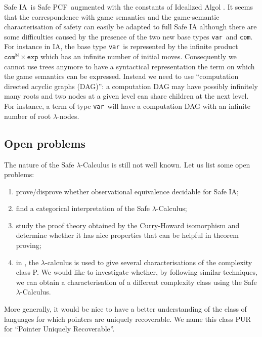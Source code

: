\documentclass{llncs}
\newcommand\nat{\mathbb{N}}
\newcommand\ialgol{\textsf{IA}}
\newcommand\iacom{\texttt{com}}
\newcommand\iaexp{\texttt{exp}}
\newcommand\iavar{\texttt{var}}
\newcommand\pcf{\textsf{PCF}}
\begin{document}
Safe \ialgol\ is Safe \pcf\ augmented with the constants of Idealized Algol
\cite{Reynolds81}. It seems that the correspondence with game semantics and the game-semantic characterisation
of safety can easily be adapted to full Safe \textsf{IA}
although there are some difficulties caused by the presence of the two new
base types \iavar\ and \iacom.
For instance in \ialgol, the base type \iavar\ is represented by the infinite product $\iacom^{\nat} \times \iaexp$ which has an infinite number of
initial moves. Consequently we cannot use trees anymore to have a syntactical representation the term on which the game semantics can be expressed.
Instead we need to use ``computation directed acyclic graphs (DAG)'': a computation DAG may
have possibly infinitely many roots and two nodes at a given level can share children at the next level. For instance, a term of type \iavar\ will have a computation DAG with an infinite number
of root $\lambda$-nodes.

\subsection{Open problems}

The nature of the Safe $\lambda$-Calculus is still not well known. Let us list some open problems:
\begin{enumerate}
\item prove/disprove whether observational equivalence decidable for Safe \ialgol;
\item find a categorical interpretation of the Safe $\lambda$-Calculus;
\item study the proof theory obtained by the Curry-Howard isomorphism and determine whether it has nice properties that can be helpful in theorem proving;
\item in \cite{DBLP:conf/tlca/LeivantM93}, the $\lambda$-calculus is used to
give several characterisations of the complexity class P. We would
like to investigate whether, by following similar techniques, we can
obtain a characterisation of a different complexity class using the
Safe $\lambda$-Calculus.
\end{enumerate}

More generally, it would be nice to have a better understanding of the class of languages for
which pointers are uniquely recoverable. We name this class PUR for
``Pointer Uniquely Recoverable''.
\end{document}
